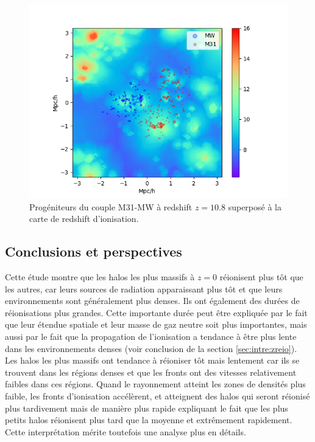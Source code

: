 \begin{figure}
		\centering
		\includegraphics[width=.95\linewidth]{img/05/map_LG.png}
        \caption[Réionisation du groupe local]{Progéniteurs du couple M31-MW à redshift $z=10.8$ superposé à la carte de redshift d'ionisation.
		\label{fig:CODA_LG}}
\end{figure}


\subsection{Conclusions et perspectives}


Cette étude montre que les halos les plus massifs à $z=0$ réionisent plus tôt que les autres, car leurs sources de radiation apparaissant plus tôt et que leurs environnements sont généralement plus denses.
Ils ont également des durées de réionisations plus grandes.
Cette importante durée peut être expliquée par le fait que leur étendue spatiale et leur masse de gaz neutre soit plus importantes, mais aussi par le fait que la propagation de l'ionisation a tendance à être plus lente dans les environnements denses (voir conclusion de la section \ref{sec:intre:zreio}).
Les halos les plus massifs ont tendance à réioniser tôt mais lentement car ils se trouvent dans les régions denses et que les fronts ont des vitesses relativement faibles dans ces régions. %
Quand le rayonnement atteint les zones de densités plus faible, les fronts d'ionisation accélèrent, et atteignent des halos qui seront réionisé plus tardivement mais de manière plus rapide expliquant le fait que les plus petits halos réionisent plus tard que la moyenne et extrêmement rapidement.
Cette interprétation mérite toutefois une analyse plus en détails.

